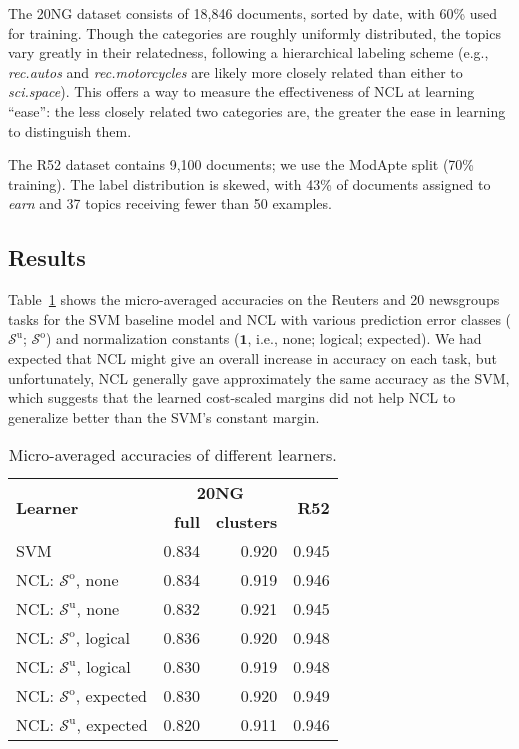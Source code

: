 \documentclass{article} %
\newcommand{\unorderedS}{\mathcal{S}^{\mathrm{u}}}
\newcommand{\orderedS}{\mathcal{S}^{\mathrm{o}}}
\newcommand{\ourmethod}{NCL}
\begin{document}
The 20NG dataset consists of 18,846 documents, sorted by date, with
60\% used for training.  Though the categories are roughly uniformly
distributed, the topics vary greatly in their relatedness, following a
hierarchical labeling scheme (e.g., \emph{rec.autos} and
\emph{rec.motorcycles} are likely more closely related than either to
\emph{sci.space}).  This offers a way to measure the effectiveness of
\ourmethod{} at learning ``ease'':   the less closely related two 
categories are, the greater the ease in learning to distinguish them.

The R52 dataset contains 9,100 documents; we use the ModApte split
(70\% training).  The label distribution is skewed, with 43\% of
documents assigned to \emph{earn} and 37 topics
receiving fewer than 50 examples.


\subsection{Results}

Table~\ref{accuraciesTable} shows the micro-averaged
accuracies on the Reuters and 20 newsgroups tasks for the 
SVM baseline model and \ourmethod{} with
various prediction error classes
($\unorderedS$; $\orderedS$) and normalization constants
($\boldsymbol{1}$, i.e., none; logical; expected).  
We had expected that \ourmethod{} might give an overall
increase in accuracy on each task, but unfortunately, \ourmethod{} 
generally gave approximately the same accuracy as  
the SVM, which
suggests that the learned cost-scaled
margins did not help \ourmethod{} to generalize better than 
the 
SVM's constant margin.  

\begin{table}[t]
\caption{Micro-averaged accuracies of different
  learners.}
\label{accuraciesTable}
\begin{center}
\begin{tabular}{l|rr|r}
\multirow{2}{*}{\bf Learner}          &  \multicolumn{2}{c|}{\bf 20NG} & \multirow{2}{*}{\bf{R52}} \\
                                      & \bf{full} & \bf{clusters}      & 
\\ \hline 
SVM                                   & 0.834     & 0.920              & 0.945 \\
\ourmethod{}: $\orderedS$, none       & 0.834     & 0.919              & 0.946 \\ 
\ourmethod{}: $\unorderedS$, none     & 0.832     & 0.921              & 0.945 \\
\ourmethod{}: $\orderedS$, logical    & 0.836     & 0.920              & 0.948 \\ 
\ourmethod{}: $\unorderedS$, logical  & 0.830     & 0.919              & 0.948 \\
\ourmethod{}: $\orderedS$, expected   & 0.830     & 0.920              & 0.949 \\ 
\ourmethod{}: $\unorderedS$, expected & 0.820     & 0.911              & 0.946 \\
\end{tabular}
\end{center}
\end{table}
\end{document}
